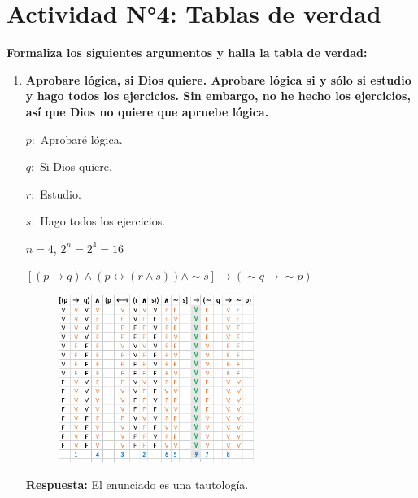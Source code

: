 \documentclass[12pt]{article}
\begin{document}
    
  
    \section*{\centering Actividad N°4: Tablas de verdad}
        \textbf{Formaliza los siguientes argumentos y halla la tabla de verdad:}

        \begin{enumerate}
            \item \textbf{Aprobare lógica, si Dios quiere. Aprobare lógica si y sólo si estudio y hago todos los ejercicios. Sin embargo, no he hecho los ejercicios, así que Dios no quiere que apruebe lógica.}
                \par$p:$ Aprobaré lógica.
                \par$q:$ Si Dios quiere.
                \par$r:$ Estudio.
                \par$s:$ Hago todos los ejercicios.
                \par$n = 4$, $2^n = 2^4 = 16$
                \par\vspace{0.5cm}$[(p \longrightarrow q) \wedge (p \longleftrightarrow (r \wedge s)) \wedge \sim s] \longrightarrow (\sim q \longrightarrow \sim p)$ 
            
                \begin{figure}[!h]
                    \centering
                    \includegraphics[width=0.6\textwidth]{Img/Tarea4_ej1.png}
                \end{figure}

                \textbf{Respuesta:} El enunciado es una tautología.


\end{enumerate}
\end{document}
